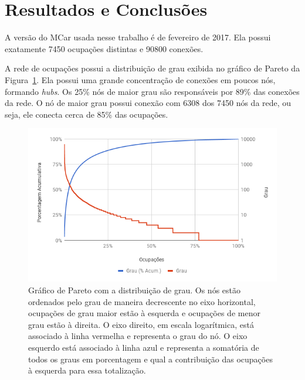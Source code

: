 \documentclass[
  article,
  11pt,
  a4paper,
  english,
  brazil,
  sumario=tradicional]{abntex2}
\begin{document}
\section{Resultados e Conclusões} \label{sec:resultados}



A versão do MCar usada nesse trabalho é de fevereiro de 2017. Ela possui exatamente 7450 ocupações distintas e 90800 conexões.

A rede de ocupações possui a distribuição de grau exibida no gráfico de Pareto da Figura~\ref{fig:pareto-ocupacoes}. Ela possui uma grande concentração de conexões em poucos nós, formando \textit{hubs}. Os 25\% nós de maior grau são responsáveis por 89\% das conexões da rede. O nó de maior grau possui conexão com 6308 dos 7450 nós da rede, ou seja, ele conecta cerca de 85\% das ocupações.

\begin{figure}[htb]
  \centering
  \includegraphics[width=0.9\linewidth]{pareto-ocupacoes.png}
  \caption{Gráfico de Pareto com a distribuição de grau. Os nós estão ordenados pelo grau de maneira decrescente no eixo horizontal, ocupações de grau maior estão à esquerda e ocupações de menor grau estão à direita. O eixo direito, em escala logarítmica, está associado à linha vermelha e representa o grau do nó. O eixo esquerdo está associado à linha azul e representa a somatória de todos os graus em porcentagem e qual a contribuição das ocupações à esquerda para essa totalização.}
  \label{fig:pareto-ocupacoes}
\end{figure}
\end{document}
